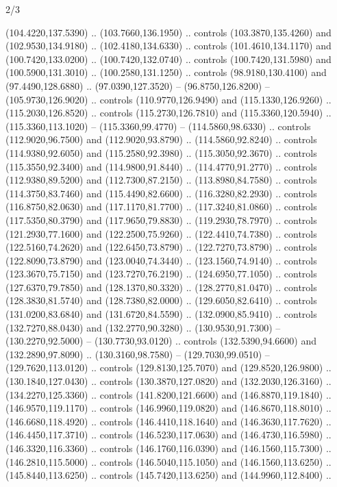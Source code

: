\begin{flagdescription}{2/3}
\begin{scope}[xshift=0.5\flaglength,yshift=0.5\flagwidth,scale=\stretchfactor]
\begin{scope}[scale=0.001645\flagwidth,yshift=65mm,xshift=-63mm]
\begin{scope}[y=0.80pt, x=0.80pt, yscale=-1,]
\begin{scope}[cm={{1.33333,0.0,0.0,1.33333,(0.0,1e-05)}}]
  (104.4220,137.5390) .. (103.7660,136.1950) .. controls (103.3870,135.4260) and
  (102.9530,134.9180) .. (102.4180,134.6330) .. controls (101.4610,134.1170) and
  (100.7420,133.0200) .. (100.7420,132.0740) .. controls (100.7420,131.5980) and
  (100.5900,131.3010) .. (100.2580,131.1250) .. controls (98.9180,130.4100) and
  (97.4490,128.6880) .. (97.0390,127.3520) -- (96.8750,126.8200) --
  (105.9730,126.9020) .. controls (110.9770,126.9490) and (115.1330,126.9260) ..
  (115.2030,126.8520) .. controls (115.2730,126.7810) and (115.3360,120.5940) ..
  (115.3360,113.1020) -- (115.3360,99.4770) -- (114.5860,98.6330) .. controls
  (112.9020,96.7500) and (112.9020,93.8790) .. (114.5860,92.8240) .. controls
  (114.9380,92.6050) and (115.2580,92.3980) .. (115.3050,92.3670) .. controls
  (115.3550,92.3400) and (114.9800,91.8440) .. (114.4770,91.2770) .. controls
  (112.9380,89.5200) and (112.7300,87.2150) .. (113.8980,84.7580) .. controls
  (114.3750,83.7460) and (115.4490,82.6600) .. (116.3280,82.2930) .. controls
  (116.8750,82.0630) and (117.1170,81.7700) .. (117.3240,81.0860) .. controls
  (117.5350,80.3790) and (117.9650,79.8830) .. (119.2930,78.7970) .. controls
  (121.2930,77.1600) and (122.2500,75.9260) .. (122.4410,74.7380) .. controls
  (122.5160,74.2620) and (122.6450,73.8790) .. (122.7270,73.8790) .. controls
  (122.8090,73.8790) and (123.0040,74.3440) .. (123.1560,74.9140) .. controls
  (123.3670,75.7150) and (123.7270,76.2190) .. (124.6950,77.1050) .. controls
  (127.6370,79.7850) and (128.1370,80.3320) .. (128.2770,81.0470) .. controls
  (128.3830,81.5740) and (128.7380,82.0000) .. (129.6050,82.6410) .. controls
  (131.0200,83.6840) and (131.6720,84.5590) .. (132.0900,85.9410) .. controls
  (132.7270,88.0430) and (132.2770,90.3280) .. (130.9530,91.7300) --
  (130.2270,92.5000) -- (130.7730,93.0120) .. controls (132.5390,94.6600) and
  (132.2890,97.8090) .. (130.3160,98.7580) -- (129.7030,99.0510) --
  (129.7620,113.0120) .. controls (129.8130,125.7070) and (129.8520,126.9800) ..
  (130.1840,127.0430) .. controls (130.3870,127.0820) and (132.2030,126.3160) ..
  (134.2270,125.3360) .. controls (141.8200,121.6600) and (146.8870,119.1840) ..
  (146.9570,119.1170) .. controls (146.9960,119.0820) and (146.8670,118.8010) ..
  (146.6680,118.4920) .. controls (146.4410,118.1640) and (146.3630,117.7620) ..
  (146.4450,117.3710) .. controls (146.5230,117.0630) and (146.4730,116.5980) ..
  (146.3320,116.3360) .. controls (146.1760,116.0390) and (146.1560,115.7300) ..
  (146.2810,115.5000) .. controls (146.5040,115.1050) and (146.1560,113.6250) ..
  (145.8440,113.6250) .. controls (145.7420,113.6250) and (144.9960,112.8400) ..

\end{scope}
\end{scope}
\end{scope}
\end{scope}
\end{flagdescription}
